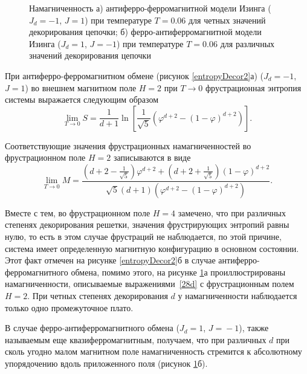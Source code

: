  \begin{figure}[h]
 	\begin{minipage}{0.49\linewidth}
 	\end{minipage}
 	\hfill
 	\begin{minipage}{0.46\linewidth}
 	\end{minipage}
 	\caption{Намагниченность а) антиферро-ферромагнитной модели Изинга ($J_d=-1$, $J=1$) при температуре $T=0.06$ для четных значений декорирования цепочки;  б) ферро-антиферромагнитной модели Изинга ($J_d=1$, $J=-1$)  при температуре $T=0.06$ для	различных значений декорирования цепочки}
 	\label{magDecor2}
 \end{figure}

При антиферро-ферромагнитном обмене (рисунок \ref{entropyDecor2}а) ($J_d=-1$, $J=1$) во внешнем магнитном поле $H=2$ при $T\rightarrow 0$ фрустрационная энтропия системы выражается следующим образом
\begin{equation}
\lim_{T \rightarrow 0} S = \frac{1}{d+1} \ln \left[\frac{1}{\sqrt{5}}\left(\varphi^{d+2}-(1-\varphi)^{d+2}\right)\right].
\label{27d}
\end{equation}

Соответствующие значения фрустрационных намагниченностей во фрустрационном поле $H=2$ записываются в виде
\begin{equation}
\lim_{T \rightarrow 0} M = \frac{\left(d+2-\frac{1}{\sqrt{5}}\right)\varphi^{d+2}+\left(d+2+\frac{1}{\sqrt{5}}\right)(1-\varphi)^{d+2}}{\sqrt{5}(d+1)(\varphi^{d+2}-(1-\varphi)^{d+2})}.
\label{28d}
\end{equation}

Вместе с тем, во фрустрационном поле $H=4$ замечено, что при различных степенях декорирования решетки, значения фрустрирующих энтропий равны нулю, то есть в этом случае фрустраций не наблюдается, по этой причине, система имеет определенную магнитную конфигурацию в основном состоянии. Этот факт отмечен на рисунке \ref{entropyDecor2}б в случае антиферро-ферромагнитного обмена, помимо этого, на рисунке \ref{magDecor2}а проиллюстрированы намагниченности, описываемые выражениями~\eqref{28d} с фрустрационным полем $H=2$. При четных степенях декорирования $d$ у намагниченности наблюдается только одно промежуточное плато. 

В случае ферро-антиферромагнитного обмена (\mbox{$J_d=1$}, $J\!\!=\!\!-1$), также называемым еще квазиферромагнитным, получаем, что при различных $d$ при сколь угодно малом магнитном поле намагниченность стремится к абсолютному упорядочению вдоль приложенного поля (рисунок \ref{magDecor2}б). 

